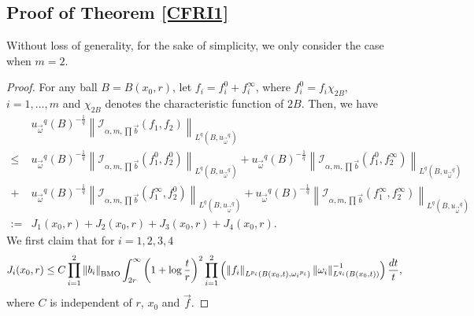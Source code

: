 \documentclass[11pt, twoside, leqno]{article}
\begin{document}
\subsection{Proof of Theorem \ref{CFRI1}}
Without loss of generality, for the sake of simplicity, we only consider the case when $m=2$.
\begin{proof}[Proof]
	For any ball $B=B(x_0,r)$, let $f_i=f^0_i+f^{\infty}_i$, where $f^0_i=f_i\chi_{2B}$, $i=1,\ldots,m$ and $\chi_{2B}$ denotes the characteristic function of $2B$. Then, we have
	\begin{equation*}
	\begin{split}
	&{{u_{\vec \omega }}^q}{\left( B \right)^{-{\frac{1}{q}}}}{\left\| {{{\mathcal I}_{\alpha,m,\prod {\vec b} }}({f_1},{f_2})} \right\|_{{L^q}(B,{u_{\vec \omega }}^q)}}\\
	\le& {{u_{\vec \omega }}^q}{\left( B \right)^{ - \frac{1}{q}}}{\left\| {{{\mathcal I}_{\alpha,m,\prod {\vec b} }}(f_1^0,f_2^0)} \right\|_{{L^q}\left( {B,{u_{\vec \omega }}^q} \right)}} + {{u_{\vec \omega }}^q}{\left( B \right)^{ - \frac{1}{q}}}{\left\| {{{\mathcal I}_{\alpha,m,\prod {\vec b} }}(f_1^0,f_2^\infty )} \right\|_{{L^q}\left( {B,{u_{\vec \omega }}^q} \right)}}\\
	+&{{u_{\vec \omega }}^q}{\left( B \right)^{ - \frac{1}{q}}}{\left\| {{{\mathcal I}_{\alpha,m,\prod {\vec b} }}(f_1^\infty ,f_2^0)} \right\|_{{L^q}\left( {B,{u_{\vec \omega }}^q} \right)}} + {{u_{\vec \omega }}^q}{\left( B \right)^{ - \frac{1}{q}}}{\left\| {{{\mathcal I}_{\alpha,m,\prod {\vec b} }}(f_1^\infty ,f_2^\infty )} \right\|_{{L^q}\left( {B,{u_{\vec \omega }}^q} \right)}}\\
	:=&{J_1}({x_0},r) + {J_2}({x_0},r) + {J_3}({x_0},r) + {J_4}({x_0},r).
	\end{split}
	\end{equation*}
	We first claim that for $i=1, 2, 3, 4$
	\begin{equation}\label{eq3.5}
	{J_i}({x_0},r) \le C \prod\limits_{i = 1}^2 {{{\left\| {{b_i}} \right\|}_{\rm BMO}}} \int_{2r}^\infty  {{{\left( {1 + \log \frac{t}{r}} \right)}^2}\prod\limits_{i = 1}^2 {\left( {{{\left\| {{f_i}} \right\|}_{{L^{{p_i}}}(B({x_0},t), {\omega _i}^{{p_i}})}}\left\| {{\omega _i}} \right\|_{{L^{{q_i}}}(B({x_0},t))}^{ - 1}} \right)\frac{{dt}}{t}} }, 
	\end{equation}
	where $C$ is independent of $r$, $x_0$ and $\vec f$. 
	

\end{proof}
\end{document}
